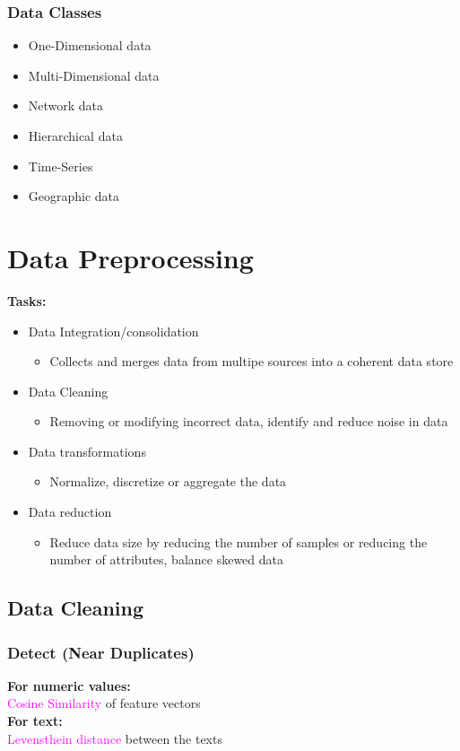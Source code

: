 \documentclass[../MLDM_Main.tex]{subfiles}
\begin{document}
\subsubsection{Data Classes}
\begin{itemize}
	\item One-Dimensional data
	\item Multi-Dimensional data
	\item Network data
	\item Hierarchical data
	\item Time-Series
	\item Geographic data
\end{itemize}

\section{Data Preprocessing}
\textbf{Tasks:}
\begin{itemize}
	\item Data Integration/consolidation
	\begin{itemize}
		\item Collects and merges data from multipe sources into a coherent data store
	\end{itemize}
	\item Data Cleaning
	\begin{itemize}
		\item Removing or modifying incorrect data, identify and reduce noise in data
	\end{itemize}
	\item Data transformations
		\begin{itemize}
			\item Normalize, discretize or aggregate the data
		\end{itemize}
	\item Data reduction
	\begin{itemize}
		\item Reduce data size by reducing the number of samples or reducing the number of attributes, balance skewed data
	\end{itemize}
	
\end{itemize}

\subsection{Data Cleaning}
\subsubsection{Detect (Near Duplicates)}
\textbf{For numeric values:}\\
\textcolor{magenta}{Cosine Similarity} of feature vectors\\
\textbf{For text:}\\
\textcolor{magenta}{Levensthein distance} between the texts\\
\end{document}
